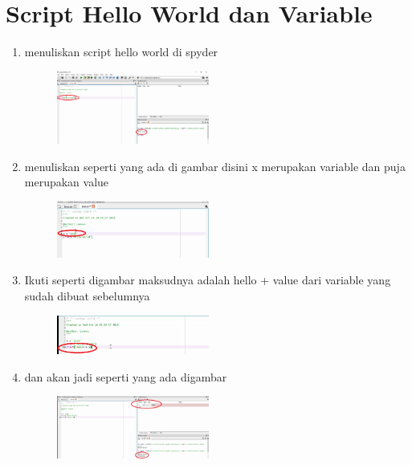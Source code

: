 \chapter*{Script Hello World dan Variable }

\begin{enumerate}
	\item menuliskan script hello world di spyder
	\begin{figure} [h]
	\includegraphics[width=5cm]{variable/4.png}
	\centering
	\end{figure}
	
	\item menuliskan seperti yang ada di gambar disini x merupakan variable dan puja merupakan value 
	\begin{figure} [h]
	\includegraphics[width=5cm]{variable/1.png}
	\centering
	\end{figure}

	\item Ikuti seperti digambar maksudnya adalah hello + value dari variable yang sudah dibuat sebelumnya  
	\begin{figure} [h]
	\includegraphics[width=5cm]{variable/2.png}
	\centering
	\end{figure}
	
	\item dan akan jadi seperti yang ada digambar 
	\begin{figure} [h]
	\includegraphics[width=5cm]{variable/3.png}
	\centering
	\end{figure}
	
\end{enumerate}
